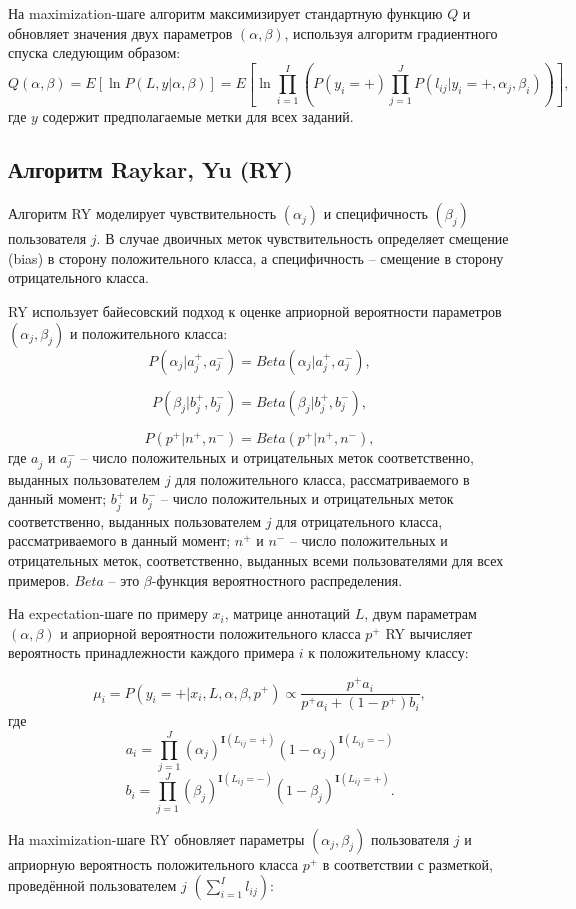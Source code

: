 \documentclass[specification,annotation,times]{itmo-student-thesis}
\begin{document}
На maximization-шаге алгоритм максимизирует стандартную функцию $Q$ и обновляет значения двух параметров $(\alpha, \beta)$, используя алгоритм градиентного спуска следующим образом:
\[Q(\alpha,\beta)=E[\ln P(L,y|\alpha,\beta)]=E[\ln\prod_{i=1}^{I}(P(y_{i}=+)\prod_{j=1}^{J}P(l_{ij}|y_{i}=+,\alpha_{j}, \beta_{i}))],\]
где $y$ содержит предполагаемые метки для всех заданий.

\subsection{Алгоритм Raykar, Yu (RY)}
Алгоритм RY \cite{raykar2010learning} моделирует чувствительность $(\alpha_{j})$ и специфичность $(\beta_{j})$ пользователя $j.$ В случае двоичных меток чувствительность определяет смещение (bias) в сторону положительного класса, а специфичность -- смещение в сторону отрицательного класса.

RY использует байесовский подход к оценке априорной вероятности параметров $(\alpha_{j},\beta_{j})$ и положительного класса:
\[P(\alpha_{j}|a_{j}^{+},a_{j}^{-})=Beta(\alpha_{j}|a_{j}^{+},a_{j}^{-}),\]

\[P(\beta_{j}|b_{j}^{+},b_{j}^{-})=Beta(\beta_{j}|b_{j}^{+},b_{j}^{-}),\]

\[P(p^{+}|n^{+},n^{-})=Beta(p^{+}|n^{+},n^{-}),\]
где $a_{j}^{}$
 и $a_{j}^{-}$ -- число положительных и отрицательных меток соответственно, выданных пользователем $j$ для положительного класса, рассматриваемого в данный момент; $b_{j}^{+}$ и $b_{j}^{-}$ -- число положительных и отрицательных меток соответственно, выданных пользователем $j$ для отрицательного класса, рассматриваемого в данный момент; $n^{+}$ и $n^{-}$ -- число положительных и отрицательных меток, соответственно, выданных всеми пользователями для всех примеров. $Beta$ -- это $\beta$-функция вероятностного распределения.

На expectation-шаге по примеру $x_{i}$, матрице аннотаций $L$, двум параметрам $(\alpha,\beta)$ и априорной вероятности положительного класса $p^{+}$ RY вычисляет вероятность принадлежности каждого примера $i$ к положительному классу:

\[\mu_{i}=P(y_{i}=+|x_{i},L,\alpha,\beta,p^{+})\propto\frac{p^{+}a_{i}}{p^{+}a_{i}+(1-p^{+})b_{i}},\]
где 
\[a_{i}=\prod_{j=1}^{J}(\alpha_{j})^{\mathbf{I}(L_{ij}=+)}(1-\alpha_{j})^{\mathbf{I}(L_{ij}=-)}\]
\[b_{i}=\prod_{j=1}^{J}(\beta_{j})^{\mathbf{I}(L_{ij}=-)}(1-\beta_{j})^{\mathbf{I}(L_{ij}=+)}.\]

На maximization-шаге RY обновляет параметры $(\alpha_{j},\beta_{j})$ пользователя $j$ и априорную вероятность положительного класса $p^{+}$ в соответствии с разметкой, проведённой пользователем $j$ $(\sum_{i=1}^{I}l_{ij})$:
\end{document}
